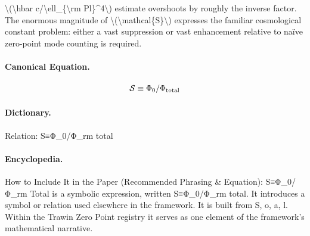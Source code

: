 \textbackslash{}(\textbackslash{}hbar c/\textbackslash{}ell\_\{\textbackslash{}rm Pl\}\textasciicircum{}4\textbackslash{}) estimate overshoots by roughly the inverse factor. The enormous magnitude of \textbackslash{}(\textbackslash{}mathcal\{S\}\textbackslash{}) expresses the familiar cosmological constant problem: either a vast suppression or vast enhancement relative to naïve zero-point mode counting is required.

\paragraph{Canonical Equation.}
\[
\mathcal{S}\equiv\Phi_0/\Phi_{\rm total}
\]

\paragraph{Dictionary.}
Relation: S≡Φ\_0/Φ\_rm total

\paragraph{Encyclopedia.}
How to Include It in the Paper (Recommended Phrasing \& Equation): S≡Φ\_0/Φ\_rm Total is a symbolic expression, written S≡Φ\_0/Φ\_rm total. It introduces a symbol or relation used elsewhere in the framework. It is built from S, o, a, l. Within the Trawin Zero Point registry it serves as one element of the framework's mathematical narrative.
